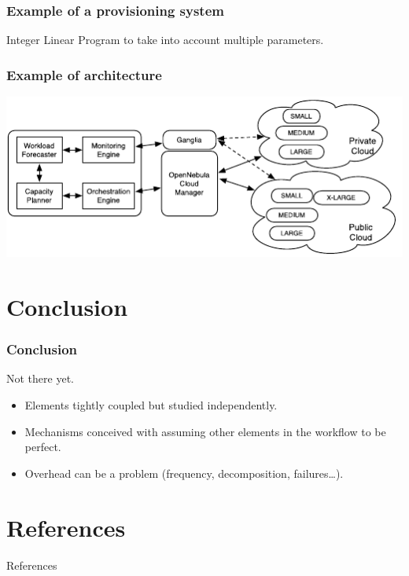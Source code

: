 \documentclass{beamer}
\begin{document}
\begin{frame}
  \frametitle{Example of a provisioning system~\cite{sharma2011cost}}
  Integer Linear Program to take into account multiple parameters.
\end{frame}

\begin{frame}
  \frametitle{Example of architecture~\cite{sharma2011cost}}
  \includegraphics[width=\textwidth]{images/elasticity4_arch.pdf}
\end{frame}


\section*{Conclusion}
\begin{frame}
  \frametitle{Conclusion}
  Not there yet.
  \begin{itemize}
    \item Elements tightly coupled but studied independently.
    \item Mechanisms conceived with assuming other elements in the workflow to be perfect.
    \item Overhead can be a problem (frequency, decomposition, failures\dots).
  \end{itemize}
\end{frame}


\appendix
\section*{References}
\begin{frame}[allowframebreaks]{References}
  
  
\end{frame}
\end{document}

